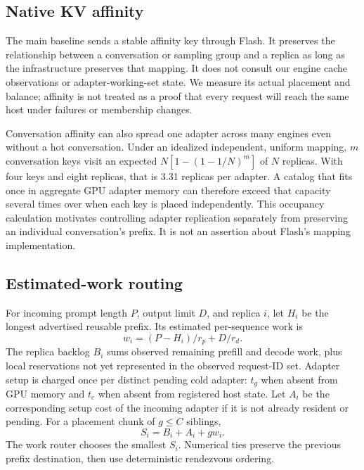\documentclass[10pt,twocolumn,letterpaper]{article}
\begin{document}
\subsection{Native KV affinity}
The main baseline sends a stable affinity key through Flash. It preserves the
relationship between a conversation or sampling group and a replica as long as
the infrastructure preserves that mapping. It does not consult our engine cache
observations or adapter-working-set state. We measure its actual placement and
balance; affinity is not treated as a proof that every request will reach the
same host under failures or membership changes.

Conversation affinity can also spread one adapter across many engines even
without a hot conversation. Under an idealized independent, uniform mapping,
$m$ conversation keys visit an expected
$N[1-(1-1/N)^m]$ of $N$ replicas. With four keys and eight replicas, that is
3.31 replicas per adapter. A catalog that fits once in aggregate GPU adapter
memory can therefore exceed that capacity several times over when each key is
placed independently. This occupancy calculation motivates controlling adapter
replication separately from preserving an individual conversation's prefix.
It is not an assertion about Flash's mapping implementation.

\subsection{Estimated-work routing}
For incoming prompt length $P$, output limit $D$, and replica $i$, let $H_i$ be
the longest advertised reusable prefix. Its estimated per-sequence work is
\begin{equation}
  w_i = (P-H_i)/r_p + D/r_d.
\end{equation}
The replica backlog $B_i$ sums observed remaining prefill and decode work,
plus local reservations not yet represented in the observed request-ID set.
Adapter setup is charged once per distinct pending cold adapter: $t_g$ when
absent from GPU memory and $t_c$ when absent from registered host state. Let
$A_i$ be the corresponding setup cost of the incoming adapter if it is not
already resident or pending. For a placement chunk of $g\le C$ siblings,
\begin{equation}
  S_i = B_i + A_i + g w_i.\label{eq:work}
\end{equation}
The work router chooses the smallest $S_i$. Numerical ties preserve the previous
prefix destination, then use deterministic rendezvous ordering.
\end{document}
